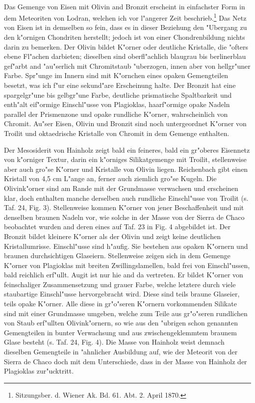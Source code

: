 \documentclass[a4paper, 11pt, oneside, polutonikogreek, german]{article}
\begin{document}
\paragraph{}
Das Gemenge von Eisen mit Olivin and Bronzit erscheint in einfachster Form in dem Meteoriten von Lodran, welchen ich vor l"angerer Zeit beschrieb.\footnote{Sitzungsber. d. Wiener Ak. Bd. 61. Abt. 2. April 1870.} Das Netz von Eisen ist in demselben so fein, dass es in dieser Beziehung den "Ubergang zu den k"ornigen Chondriten herstellt; jedoch ist von einer Chondrenbildung nichts darin zu bemerken. Der Olivin bildet K"orner oder deutliche Kristalle, die "ofters ebene Fl"achen darbieten; dieselben sind oberfl"achlich blaugrau bis berlinerblau gef"arbt and "au"serlich mit Chromitstaub "uberzogen, innen aber von hellgr"uner Farbe. Spr"unge im Innern sind mit K"ornchen eines opaken Gemengteilen besetzt, was ich f"ur eine sekund"are Erscheinung halte. Der Bronzit hat eine spargelgr"une bis gelbgr"une Farbe, deutliche prismatische Spaltbarkeit und enth"alt eif"ormige Einschl"usse von Plagioklas, haarf"ormige opake Nadeln parallel der Prismenzone und opake rundliche K"orner, wahrscheinlich von Chromit. Au"ser Eisen, Olivin und Bronzit sind noch untergeordnet K"orner von Troilit und oktaedrische Kristalle von Chromit in dem Gemenge enthalten.

Der Mesosiderit von Hainholz zeigt bald ein feineres, bald ein gr"oberes Eisennetz von k"orniger Textur, darin ein k"orniges Silikatgemenge mit Troilit, stellenweise aber auch gro"se K"orner und Kristalle von Olivin liegen. Reichenbach gibt einen Kristall von 4,5 cm L"ange an, ferner auch ziemlich gro"se Kugeln. Die Olivink"orner sind am Rande mit der Grundmasse verwachsen und erscheinen klar, doch enthalten manche derselben auch rundliche Einschl"usse von Troilit (s. Taf. 24, Fig. 3). Stellenweise kommen K"orner von jener Beschaffenheit und mit denselben braunen Nadeln vor, wie solche in der Masse von der Sierra de Chaco beobachtet wurden and deren eines auf Taf. 23 in Fig. 4 abgebildet ist. Der Bronzit bildet kleinere K"orner als der Olivin und zeigt keine deutlichen Kristallumrisse. Einschl"usse sind h"aufig. Sie bestehen aus opaken K"ornern und braunen durchsichtigen Glaseiern. Stellenweise zeigen sich in dem Gemenge K"orner von Plagioklas mit breiten Zwillingslamellen, bald frei von Einschl"ussen, bald reichlich erf"ullt. Augit ist nur hie and da vertreten. Er bildet K"orner von feinschaliger Zusammensetzung und grauer Farbe, welche letztere durch viele staubartige Einschl"usse hervorgebracht wird. Diese sind teils braune Glaseier, teils opake K"orner. Alle diese in gr"o"seren K"ornern vorkommenden Silikate sind mit einer Grundmasse umgeben, welche zum Teile aus gr"o"seren rundlichen von Staub erf"ullten Olivink"ornern, so wie aus den "ubrigen schon genannten Gemengteilen in bunter Verwachsung und aus zwischengeklemmtem braunem Glase besteht (s. Taf. 24, Fig. 4). Die Masse von Hainholz weist demnach dieselben Gemengteile in "ahnlicher Ausbildung auf, wie der Meteorit von der Sierra de Chaco doch mit dem Unterschiede, dass in der Masse von Hainholz der Plagioklas zur"ucktritt.
\end{document}

